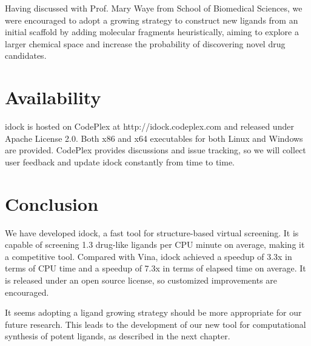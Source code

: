 Having discussed with Prof. Mary Waye from School of Biomedical Sciences, we were encouraged to adopt a growing strategy to construct new ligands from an initial scaffold by adding molecular fragments heuristically, aiming to explore a larger chemical space and increase the probability of discovering novel drug candidates.

\section{Availability}

idock is hosted on CodePlex at http://idock.codeplex.com and released under Apache License 2.0. Both x86 and x64 executables for both Linux and Windows are provided. CodePlex provides discussions and issue tracking, so we will collect user feedback and update idock constantly from time to time.

\section{Conclusion}

We have developed idock, a fast tool for structure-based virtual screening. It is capable of screening 1.3 drug-like ligands per CPU minute on average, making it a competitive tool. Compared with Vina, idock achieved a speedup of 3.3x in terms of CPU time and a speedup of 7.3x in terms of elapsed time on average. It is released under an open source license, so customized improvements are encouraged.

It seems adopting a ligand growing strategy should be more appropriate for our future research. This leads to the development of our new tool for computational synthesis of potent ligands, as described in the next chapter.

\chapterend
